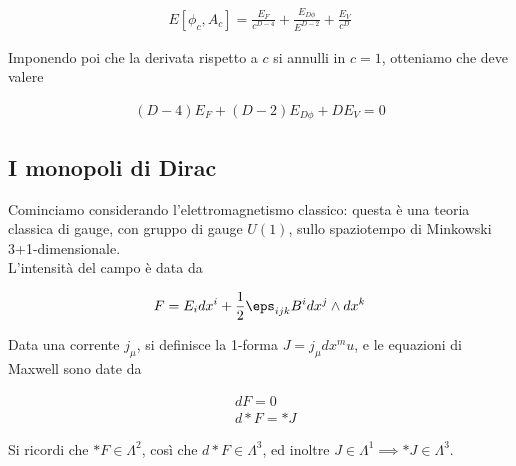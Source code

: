 \documentclass{report}
\begin{document}
\begin{align}
    E[\phi_c, A_c] = \frac{E_F}{c^{D-4}} + \frac{E_{D\phi}}{E^{D-2}} + \frac{E_V}{c^D}
\end{align}

Imponendo poi che la derivata rispetto a \(c\) si annulli in \(c=1\), otteniamo che deve valere

\begin{align}
    (D-4)E_F + (D-2)E_{D\phi} + DE_V = 0
\end{align}


\subsection{I monopoli di Dirac}

Cominciamo considerando l'elettromagnetismo classico: questa è una teoria classica di gauge, con gruppo di gauge \(U(1)\), sullo spaziotempo di Minkowski 3+1-dimensionale. \\

L'intensità del campo è data da 

\begin{align}
    F = E_idx^i + \frac{1}{2}\eps_{ijk}B^i dx^j \wedge dx^k
\end{align}

Data una corrente \(j_\mu\), si definisce la 1-forma \(J = j_\mu dx^mu\), e le equazioni di Maxwell sono date da 

\begin{align}
    &d F = 0 \\
    &d * F = *J 
\end{align}

Si ricordi che \(*F \in \Lambda^2\), così che \(d * F \in \Lambda^3\), ed inoltre \(J \in \Lambda^1 \implies *J \in \Lambda^3\). \\
\end{document}
